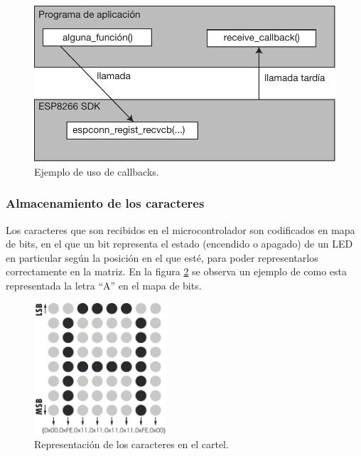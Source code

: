 \begin{figure}[ht!]
	\begin{center}
		\centering
		\includegraphics[scale=1]{imagenes/callbacks.pdf}
		\caption{Ejemplo de uso de callbacks.}
		\label{fig:callbacks}
	\end{center}
\end{figure}

\subsubsection{Almacenamiento de los caracteres}

Los caracteres que son recibidos en el microcontrolador son codificados en mapa de bits, en el que un bit representa el estado (encendido o apagado) de un LED en particular según la posición en el que esté, para poder representarlos correctamente en la matriz. En la figura \ref{fig:repAscii} se observa un ejemplo de como esta representada la letra \enquote{A} en el mapa de bits.

\begin{figure}[h!]
    \centering
    \includegraphics[width=0.44\textwidth]{imagenes/codificacionAscii.pdf}
    \caption{Representación de los caracteres en el cartel.}
    \label{fig:repAscii}
\end{figure}

